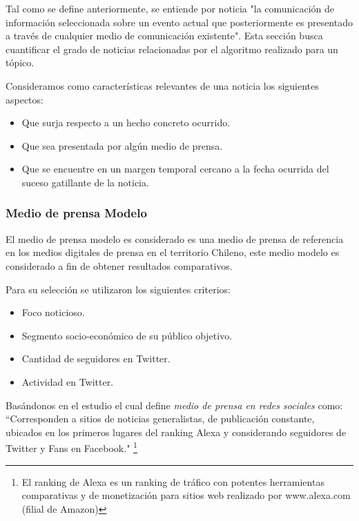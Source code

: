 Tal como se define anteriormente, se entiende por noticia "la comunicación de información seleccionada sobre un evento actual que posteriormente es presentado a través de cualquier medio de comunicación existente".\cite{Shirky_2008_Herecomes} Esta sección busca cuantificar el grado de noticias relacionadas por el algoritmo realizado para un tópico.

Consideramos como características relevantes de una noticia los siguientes aspectos:

\begin{itemize}
	\item Que surja respecto a un hecho concreto ocurrido.
	\item Que sea presentada por algún medio de prensa.
	\item Que se encuentre en un margen temporal cercano a la fecha ocurrida del suceso gatillante de la noticia.
\end{itemize}

\subsubsection{Medio de prensa Modelo}

El medio de prensa modelo es considerado es una medio de prensa de referencia en los medios digitales de prensa en el territorio Chileno, este medio modelo es considerado a fin de obtener resultados comparativos.

Para su selección se utilizaron los siguientes criterios:

\begin{itemize}
	\item Foco noticioso.
	\item Segmento socio-económico de su público objetivo.
	\item Cantidad de seguidores en Twitter.
	\item Actividad en Twitter.
\end{itemize}

Basándonos en el estudio \cite{puroperiodismoMenciones} el cual define \emph{medio de prensa en redes sociales} como: ``Corresponden a sitios de noticias generalistas, de publicación constante, ubicados en los primeros lugares del ranking Alexa y considerando seguidores de Twitter y Fans en Facebook."  \footnote{El ranking de Alexa es un ranking de tráfico con potentes herramientas comparativas y de monetización para sitios web realizado por www.alexa.com (filial de Amazon)}


